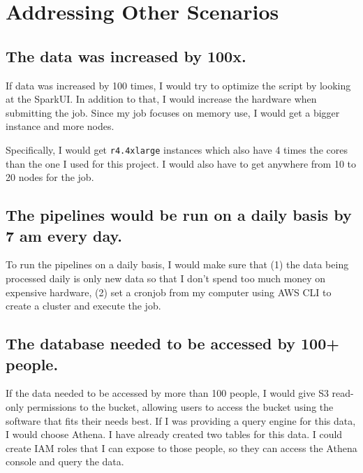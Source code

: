 \documentclass[12pt,letterpaper]{article}
\begin{document}
\section*{Addressing Other Scenarios}

\subsection*{The data was increased by 100x.}
If data was increased by 100 times, I would try to optimize the script by
looking at the SparkUI. In addition to that, I would increase the hardware when
submitting the job.  Since my job focuses on memory use, I would get a bigger
instance and more nodes.

Specifically, I would get \texttt{r4.4xlarge} instances which also have 4
times the cores than the one I used for this project. I would also have to get
anywhere from 10 to 20 nodes for the job.

\subsection*{The pipelines would be run on a daily basis by 7 am every day.}
To run the pipelines on a daily basis, I would make sure that (1) the data
being processed daily is only new data so that I don't spend too much money on
expensive hardware, (2) set a cronjob from my computer using AWS CLI to create
a cluster and execute the job.

\subsection*{The database needed to be accessed by 100+ people.}
If the data needed to be accessed by more than 100 people, I would give S3
read-only permissions to the bucket, allowing users to access the bucket using
the software that fits their needs best.  If I was providing a query engine for
this data, I would choose Athena. I have already created two tables for this
data. I could create IAM roles that I can expose to those people, so they can
access the Athena console and query the data.
\end{document}
